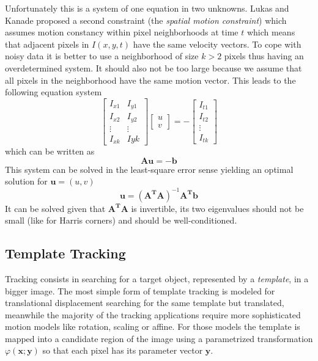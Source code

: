 \documentclass[a4paper,twocolumn]{article}
\begin{document}
Unfortunately this is a system of one equation in two unknowns. Lukas and Kanade
proposed a second constraint (the \textit{spatial motion constraint}) which
assumes motion constancy within pixel neighborhoods at time $t$ which means that
adjacent pixels in $I(x,y,t)$ have the same velocity vectors. To cope with noisy
data it is better to use a neighborhood of size $k > 2$ pixels thus having an
overdetermined system. It should also not be too large because we assume that
all pixels in the neighborhood have the same motion vector. This leads to the
following equation system
\begin{equation}
	\begin{bmatrix}
		I_{x1} & I_{y1} \\
		I_{x2} & I_{y2} \\
		\vdots & \vdots \\
		I_{xk} & I{yk}
	\end{bmatrix}
	\begin{bmatrix}
		u \\ v
	\end{bmatrix}
	= -\begin{bmatrix}
		I_{t1} \\ I_{t2} \\ \vdots \\ I_{tk}
	\end{bmatrix}
	\label{eq:optic-flow-lk}
\end{equation}
which can be written as
\begin{equation}
	\mathbf{A}\mathbf{u}=-\mathbf{b}
\end{equation}
This system can be solved in the least-square error sense yielding an optimal
solution for $\mathbf{u}=(u,v)$
\begin{equation}
	\mathbf{u}=(\mathbf{A^TA})^{-1}\mathbf{A^Tb}
\end{equation}
It can be solved given that $\mathbf{A^TA}$ is invertible, its two eigenvalues
should not be small (like for Harris corners) and should be well-conditioned.

\subsection{Template Tracking}
Tracking consists in searching for a target object, represented by a
\textit{template}, in a bigger image. The most simple form of template tracking
is modeled for translational displacement searching for the same template but
translated, meanwhile the majority of the tracking applications require more
sophisticated motion models like rotation, scaling or affine. For those models
the template is mapped into a candidate region of the image using a parametrized
transformation $\varphi(\mathbf{x;y})$ so that each pixel has its parameter
vector $\mathbf{y}$.
\end{document}
